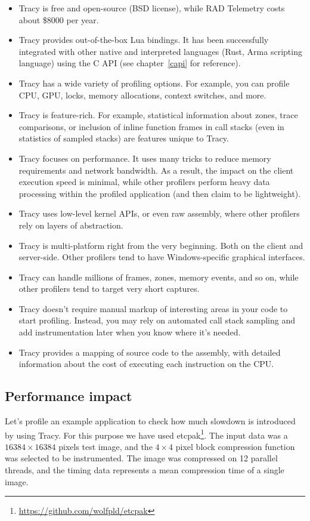 \documentclass[hidelinks,titlepage,a4paper]{article}
\begin{document}
\begin{itemize}
\item Tracy is free and open-source (BSD license), while RAD Telemetry costs about \$8000 per year.
\item Tracy provides out-of-the-box Lua bindings. It has been successfully integrated with other native and interpreted languages (Rust, Arma scripting language) using the C API (see chapter~\ref{capi} for reference).
\item Tracy has a wide variety of profiling options. For example, you can profile CPU, GPU, locks, memory allocations, context switches, and more.
\item Tracy is feature-rich. For example, statistical information about zones, trace comparisons, or inclusion of inline function frames in call stacks (even in statistics of sampled stacks) are features unique to Tracy.
\item Tracy focuses on performance. It uses many tricks to reduce memory requirements and network bandwidth. As a result, the impact on the client execution speed is minimal, while other profilers perform heavy data processing within the profiled application (and then claim to be lightweight).
\item Tracy uses low-level kernel APIs, or even raw assembly, where other profilers rely on layers of abstraction.
\item Tracy is multi-platform right from the very beginning. Both on the client and server-side. Other profilers tend to have Windows-specific graphical interfaces.
\item Tracy can handle millions of frames, zones, memory events, and so on, while other profilers tend to target very short captures.
\item Tracy doesn't require manual markup of interesting areas in your code to start profiling. Instead, you may rely on automated call stack sampling and add instrumentation later when you know where it's needed.
\item Tracy provides a mapping of source code to the assembly, with detailed information about the cost of executing each instruction on the CPU.
\end{itemize}

\subsection{Performance impact}
\label{perfimpact}

Let's profile an example application to check how much slowdown is introduced by using Tracy. For this purpose we have used etcpak\footnote{\url{https://github.com/wolfpld/etcpak}}. The input data was a $16384 \times 16384$ pixels test image, and the $4 \times 4$ pixel block compression function was selected to be instrumented. The image was compressed on 12 parallel threads, and the timing data represents a mean compression time of a single image.
\end{document}

